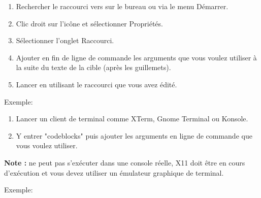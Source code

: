 \begin{enumerate}[noitemsep] 
\item Rechercher le raccourci vers \codeblocks sur le bureau ou via le menu Démarrer.
\item Clic droit sur l'icône et sélectionner Propriétés.
\item Sélectionner l'onglet Raccourci.
\item Ajouter en fin de ligne de commande les arguments que vous voulez utiliser à la suite du texte de la cible (après les guillemets).
\item Lancer \codeblocks en utilisant le raccourci que vous avez édité.
\end{enumerate}

Exemple:\\

\begin{enumerate}[noitemsep] 
\item Lancer un client de terminal comme XTerm, Gnome Terminal ou Konsole.
\item Y entrer "codeblocks" puis ajouter les arguments en ligne de commande que vous voulez utiliser.
\end{enumerate}
\textbf{Note :} \codeblocks ne peut pas s'exécuter dans une console réelle, X11 doit être en cours d'exécution et vous devez utiliser un émulateur graphique de terminal.

Exemple:\\

\newpage
